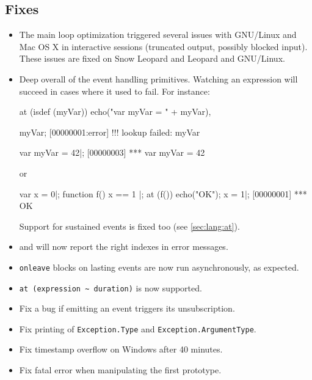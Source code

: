 \subsection{Fixes}
\begin{itemize}
\item The main loop optimization triggered several issues with GNU/Linux and
  Mac OS X in interactive sessions (truncated output, possibly blocked
  input).  These issues are fixed on Snow Leopard and Leopard and GNU/Linux.
\item Deep overall of the event handling primitives.  Watching an expression
  will succeed in cases where it used to fail.  For instance:

\begin{urbiscript}
at (isdef (myVar))
  echo("var myVar = " + myVar),

myVar;
[00000001:error] !!! lookup failed: myVar

var myVar = 42|;
[00000003] *** var myVar = 42
\end{urbiscript}

\noindent
or

\begin{urbiunchecked}
var x = 0|;
function f() { x == 1 }|;
at (f()) echo("OK");
x = 1|;
[00000001] *** OK
\end{urbiunchecked}

  Support for sustained events is fixed too (see \autoref{sec:lang:at}).
\item {} and  will now report the right
  indexes in error messages.
\item \lstinline|onleave| blocks on lasting events are now run
  asynchronously, as expected.
\item \lstinline|at (expression ~ duration)| is now supported.
\item Fix a bug if emitting an event triggers its unsubscription.
\item Fix printing of \lstinline|Exception.Type| and
  \lstinline|Exception.ArgumentType|.
\item Fix timestamp overflow on Windows after 40 minutes.
\item Fix fatal error when manipulating the first  prototype.
\end{itemize}


